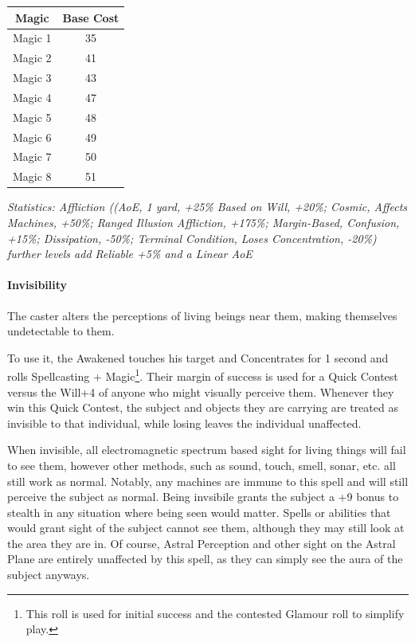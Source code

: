 \begin{multicols*}{3}
	\begin{center}
		\begin{tabular}{|c|c|}
			\hline
			Magic & Base Cost \\
			\hline
			\hline
			Magic 1 & 35 \\
			Magic 2 & 41 \\
			Magic 3 & 43 \\
			Magic 4 & 47 \\
			Magic 5 & 48 \\
			Magic 6 & 49 \\
			Magic 7 & 50 \\
			Magic 8 & 51 \\
			\hline
		\end{tabular}
	\end{center}
	
	\textcolor{OliveGreen}{\textit{Statistics: Affliction ((AoE, 1 yard, +25\% Based on Will, +20\%; Cosmic, Affects Machines, +50\%; Ranged Illusion Affliction, +175\%; Margin-Based, Confusion, +15\%; Dissipation, -50\%; Terminal Condition, Loses Concentration, -20\%)  further levels add Reliable +5\% and a Linear AoE}}
		
	\paragraph{Invisibility}
	
	The caster alters the perceptions of living beings near them, making themselves undetectable to them.
	
	To use it, the Awakened touches his target and Concentrates for 1 second and rolls Spellcasting + Magic\footnote{This roll is used for initial success and the contested Glamour roll to simplify play.}. Their margin of success is used for a Quick Contest versus the Will+4 of anyone who might visually perceive them. Whenever they win this Quick Contest, the subject and objects they are carrying are treated as invisible to that individual, while losing leaves the individual unaffected.
	
	When invisible, all electromagnetic spectrum based sight for living things will fail to see them, however other methods, such as sound, touch, smell, sonar, etc. all still work as normal. Notably, any machines are immune to this spell and will still perceive the subject as normal. Being invsibile grants the subject a +9 bonus to stealth in any situation where being seen would matter. Spells or abilities that would grant sight of the subject cannot see them, although they may still look at the area they are in. Of course, Astral Perception and other sight on the Astral Plane are entirely unaffected by this spell, as they can simply see the aura of the subject anyways.
	

\end{multicols*}
